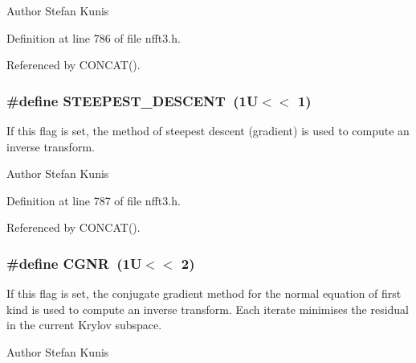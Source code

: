 \begin{DoxyAuthor}{Author}
Stefan Kunis 
\end{DoxyAuthor}


Definition at line 786 of file nfft3.\-h.



Referenced by C\-O\-N\-C\-A\-T().

\hypertarget{group__solver_ga1f016d06d661c80eacb5182d80813cd9}{
\subsubsection[{S\-T\-E\-E\-P\-E\-S\-T\-\_\-\-D\-E\-S\-C\-E\-N\-T}]{\setlength{\rightskip}{0pt plus 5cm}\#define S\-T\-E\-E\-P\-E\-S\-T\-\_\-\-D\-E\-S\-C\-E\-N\-T~(1\-U$<$$<$ 1)}}\label{group__solver_ga1f016d06d661c80eacb5182d80813cd9}
If this flag is set, the method of steepest descent (gradient) is used to compute an inverse transform.

\begin{DoxyAuthor}{Author}
Stefan Kunis 
\end{DoxyAuthor}


Definition at line 787 of file nfft3.\-h.



Referenced by C\-O\-N\-C\-A\-T().

\hypertarget{group__solver_ga5716b96b5141dfb52b747a78b11defa7}{
\subsubsection[{C\-G\-N\-R}]{\setlength{\rightskip}{0pt plus 5cm}\#define C\-G\-N\-R~(1\-U$<$$<$ 2)}}\label{group__solver_ga5716b96b5141dfb52b747a78b11defa7}
If this flag is set, the conjugate gradient method for the normal equation of first kind is used to compute an inverse transform. Each iterate minimises the residual in the current Krylov subspace.

\begin{DoxyAuthor}{Author}
Stefan Kunis 
\end{DoxyAuthor}


